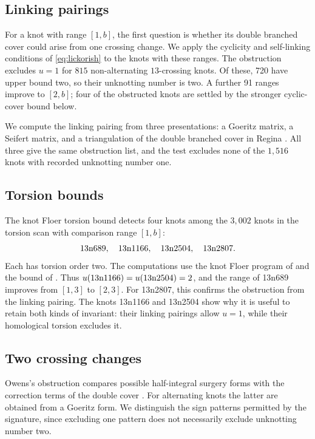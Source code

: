 \documentclass[12pt, oneside]{amsart}
\newcommand{\kn}[2]{\textup{#1#2}}
\newcommand{\nImprovedL}{91}
\newcommand{\nUtwoL}{720}
\begin{document}
\subsection{Linking pairings}

For a knot with range $[1,b]$, the first question is whether its double branched cover
could arise from one crossing change. We apply the cyclicity and self-linking conditions
of \eqref{eq:lickorish} to the knots with these ranges. The obstruction excludes $u=1$
for $815$ non-alternating $13$-crossing knots. Of these, \nUtwoL{} have upper bound two,
so their unknotting number is two. A further \nImprovedL{} ranges improve to $[2,b]$;
four of the obstructed knots are settled by the stronger cyclic-cover bound below.

We compute the linking pairing from three presentations: a Goeritz matrix,
a Seifert matrix, and a triangulation of the double branched cover in Regina
\cite{Regina}. All three give the same obstruction list, and the test excludes
none of the $1{,}516$ knots with recorded unknotting number one.

\subsection{Torsion bounds}\label{sec:torsion}

The knot Floer torsion bound detects four knots among the
$3{,}002$ knots in the torsion scan with comparison range $[1,b]$:
\[
    \kn{13n}{689},\quad\kn{13n}{1166},\quad
    \kn{13n}{2504},\quad\kn{13n}{2807}.
\]
Each has torsion order two. The computations use the knot Floer program of \cite{HFK}
and the bound of \cite{AE,JMZ}.
Thus $u(\kn{13n}{1166})=u(\kn{13n}{2504})=2$, and the range of \kn{13n}{689}
improves from $[1,3]$ to $[2,3]$. For \kn{13n}{2807}, this confirms the obstruction from the linking pairing. The knots \kn{13n}{1166} and \kn{13n}{2504} show why it is useful to retain
both kinds of invariant: their linking pairings allow $u=1$, while their homological
torsion excludes it.

\subsection{Two crossing changes}\label{sec:owens}

Owens's obstruction compares possible half-integral surgery forms with the correction
terms of the double cover \cite{Owens}. For alternating knots the latter are obtained
from a Goeritz form. We distinguish the sign patterns permitted by the signature, since
excluding one pattern does not necessarily exclude unknotting number two.
\end{document}

